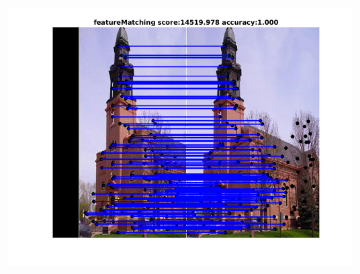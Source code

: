 \documentclass[
	fontsize=12pt,
	paper=a4,
	twoside=false,
	numbers=noenddot,
	plainheadsepline,
	toc=listof,
	toc=bibliography
]{scrartcl}
\begin{document}
\begin{figure}[h]
\begin{subfigure}[b]{0.33\textwidth}
		\includegraphics[scale=0.25]{"fig_ver2608/RealImages/ImgTrafo/anchor_descr/using_cpd_afftrafo/fi_3_featureMatching"} 
	\end{subfigure} 	
	

\end{figure}
\end{document}
